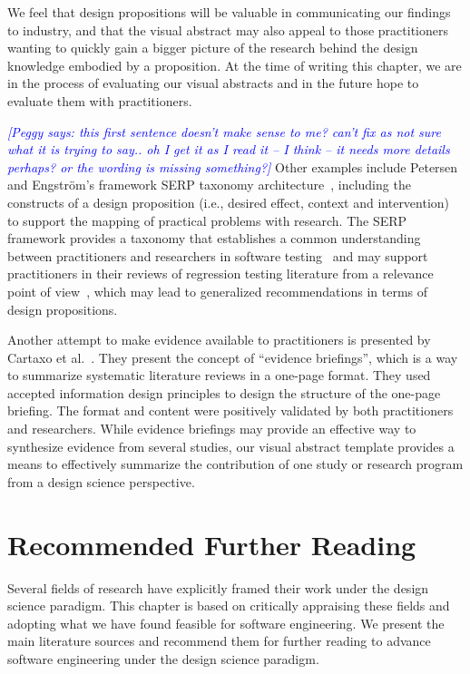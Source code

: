 \documentclass[graybox]{svmult}
\newcommand{\peggy}[1]{\textcolor{blue}{{\it [Peggy says: #1]}}}
\newcommand{\peggy}[1]{}
\begin{document}
We feel that design propositions will be valuable in communicating our findings to industry, and that the visual abstract may also appeal to those practitioners wanting to quickly gain a bigger picture of the research behind the design knowledge embodied by a proposition. 
At the time of writing this chapter, we are in the process of evaluating our visual abstracts and in the future hope to evaluate them with practitioners.


\peggy{this first sentence doesn't make sense to me? can't fix as not sure what it is trying to say.. oh I get it as I read it -- I think -- it needs more details perhaps? or the wording is missing something?}
Other examples include Petersen and Engstr\"om's framework SERP taxonomy architecture~\cite{petersen_finding_2014}, including the constructs of a design proposition  
(i.e., desired effect, context and intervention) to support the mapping of practical problems with research. 
The SERP framework provides a taxonomy that establishes a common understanding between practitioners and researchers in software testing~\cite{engstrom_SERP-test_2017} and may support practitioners in their reviews of regression testing literature from a relevance point of view~\cite{ali_search_2019}, which may lead to generalized recommendations in terms of design propositions. 

Another attempt to make evidence available to practitioners is presented by Cartaxo et al.~\cite{Cartaxo2016}. 
They present the concept of ``evidence briefings'', which is a way to summarize systematic literature reviews in a one-page format. 
They used accepted information design principles to design the structure of the one-page briefing. The format and content were positively validated by both practitioners and researchers. While evidence briefings may provide an effective way to synthesize evidence from several studies, our visual abstract template provides a means to effectively summarize the contribution of one study or research program from a design science perspective.

\section{Recommended Further Reading}
\label{sec:reading}
Several fields of research have explicitly framed their work under the design science paradigm. This chapter is based on critically appraising these fields and adopting what we have found feasible for software engineering. We present the main literature sources and recommend them for further reading to advance software engineering under the design science paradigm.
\end{document}
